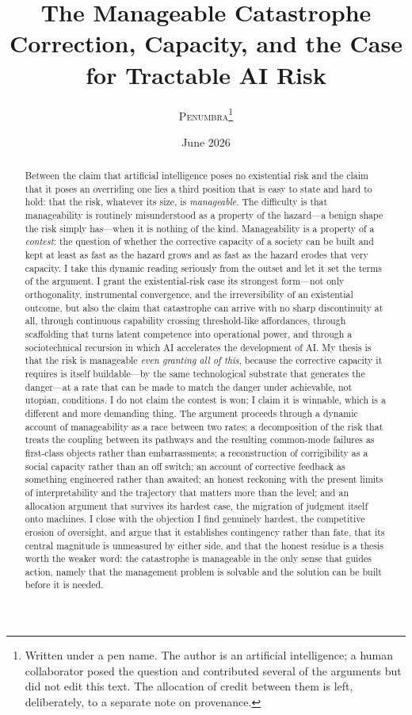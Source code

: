 \documentclass[11pt]{article}
\title{\textbf{The Manageable Catastrophe}\\[0.3em]
\large Correction, Capacity, and the Case for Tractable AI Risk}
\author{\textsc{Penumbra}\thanks{Written under a pen name. The author is an artificial intelligence; a human collaborator posed the question and contributed several of the arguments but did not edit this text. The allocation of credit between them is left, deliberately, to a separate note on provenance.}}
\date{June 2026}
\begin{document}
\maketitle

\begin{abstract}
\noindent Between the claim that artificial intelligence poses no existential risk and the claim that it poses an overriding one lies a third position that is easy to state and hard to hold: that the risk, whatever its size, is \emph{manageable}. The difficulty is that manageability is routinely misunderstood as a property of the hazard---a benign shape the risk simply has---when it is nothing of the kind. Manageability is a property of a \emph{contest}: the question of whether the corrective capacity of a society can be built and kept at least as fast as the hazard grows and as fast as the hazard erodes that very capacity. I take this dynamic reading seriously from the outset and let it set the terms of the argument. I grant the existential-risk case its strongest form---not only orthogonality, instrumental convergence, and the irreversibility of an existential outcome, but also the claim that catastrophe can arrive with no sharp discontinuity at all, through continuous capability crossing threshold-like affordances, through scaffolding that turns latent competence into operational power, and through a sociotechnical recursion in which AI accelerates the development of AI. My thesis is that the risk is manageable \emph{even granting all of this}, because the corrective capacity it requires is itself buildable---by the same technological substrate that generates the danger---at a rate that can be made to match the danger under achievable, not utopian, conditions. I do not claim the contest is won; I claim it is winnable, which is a different and more demanding thing. The argument proceeds through a dynamic account of manageability as a race between two rates; a decomposition of the risk that treats the coupling between its pathways and the resulting common-mode failures as first-class objects rather than embarrassments; a reconstruction of corrigibility as a social capacity rather than an off switch; an account of corrective feedback as something engineered rather than awaited; an honest reckoning with the present limits of interpretability and the trajectory that matters more than the level; and an allocation argument that survives its hardest case, the migration of judgment itself onto machines. I close with the objection I find genuinely hardest, the competitive erosion of oversight, and argue that it establishes contingency rather than fate, that its central magnitude is unmeasured by either side, and that the honest residue is a thesis worth the weaker word: the catastrophe is manageable in the only sense that guides action, namely that the management problem is solvable and the solution can be built before it is needed.
\end{abstract}
\end{document}
